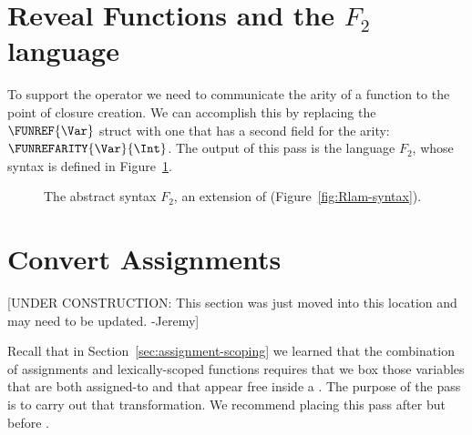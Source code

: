 \documentclass[7x10]{TimesAPriori_MIT}%
\newcommand{\gray}[1]{{\color{gray} #1}}
\begin{document}
\section{Reveal Functions and the $F_2$ language}
\label{sec:reveal-functions-r5}

To support the  operator we need to communicate
the arity of a function to the point of closure creation.  We can
accomplish this by replacing the $\FUNREF{\Var}$ struct with one that
has a second field for the arity: $\FUNREFARITY{\Var}{\Int}$.  The
output of this pass is the language $F_2$, whose syntax is defined in
Figure~\ref{fig:f2-syntax}.

\begin{figure}[tp]
\centering
\fbox{
\begin{minipage}{0.96\textwidth}
\[
\begin{array}{lcl}
\Exp &::=& \ldots \MID \FUNREFARITY{\Var}{\Int}\\
 \Def &::=& \gray{ \FUNDEF{\Var}{([\Var \code{:} \Type]\ldots)}{\Type}{\code{'()}}{\Exp} }\\
  F_2 &::=& \gray{\PROGRAMDEFS{\code{'()}}{\LP \Def\ldots \RP}}
\end{array}
\]
\end{minipage}
}
\caption{The abstract syntax $F_2$, an extension of \LangLam{}
  (Figure~\ref{fig:Rlam-syntax}).}
\label{fig:f2-syntax}
\end{figure}


\section{Convert Assignments}
\label{sec:convert-assignments}

[UNDER CONSTRUCTION: This section was just moved into this location
and may need to be updated. -Jeremy]

Recall that in Section~\ref{sec:assignment-scoping} we learned that
the combination of assignments and lexically-scoped functions requires
that we box those variables that are both assigned-to and that appear
free inside a . The purpose of the
 pass is to carry out that transformation.
We recommend placing this pass after  but before
.
\end{document}

